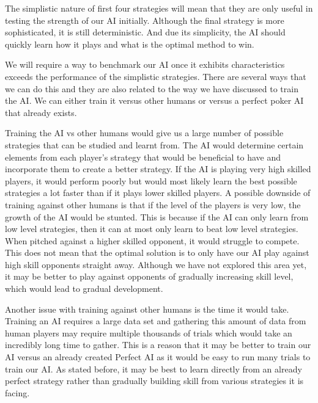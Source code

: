 \documentclass{article}
\begin{document}
\begin{multicols*}{2}
The simplistic nature of first four strategies will mean that they are only useful in testing the strength of our AI initially. Although the final strategy is more sophisticated, it is still deterministic. And due its simplicity, the AI should quickly learn how it plays and what is the optimal method to win.
\newline

We will require a way to benchmark our AI once it exhibits characteristics exceeds the performance of the simplistic strategies. There are several ways that we can do this and they are also related to the way we have discussed to train the AI. We can either train it versus other humans or versus a perfect poker AI that already exists.
\newline

Training the AI vs other humans would give us a large number of possible strategies that can be studied and learnt from. The AI would determine certain elements from each player's strategy that would be beneficial to have and incorporate them to create a better strategy. If the AI is playing very high skilled players, it would perform poorly but would most likely learn the best possible strategies a lot faster than if it plays lower skilled players. A possible downside of training against other humans is that if the level of the players is very low, the growth of the AI would be stunted. This is because if the AI can only learn from low level strategies, then it can at most only learn to beat low level strategies. When pitched against a higher skilled opponent, it would struggle to compete. This does not mean that the optimal solution is to only have our AI play against high skill opponents straight away. Although we have not explored this area yet, it may be better to play against opponents of gradually increasing skill level, which would lead to gradual development.
\newline

Another issue with training against other humans is the time it would take. Training an AI requires a large data set and gathering this amount of data from human players may require multiple thousands of trials which would take an incredibly long time to gather. This is a reason that it may be better to train our AI versus an already created Perfect AI as it would be easy to run many trials to train our AI. As stated before, it may be best to learn directly from an already perfect strategy rather than gradually building skill from various strategies it is facing.


\end{multicols*}
\end{document}
